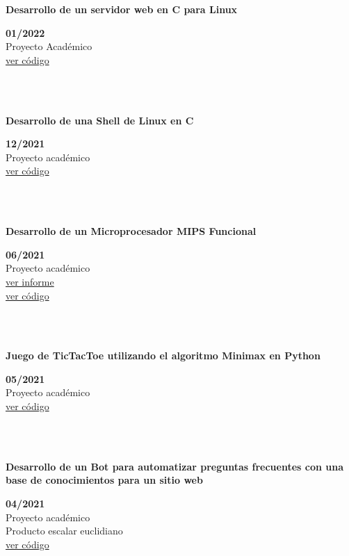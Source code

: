 \documentclass{article}
\begin{document}
\begin{minipage}{0.8\textwidth}
\parbox{0.8\linewidth}{\textbf{Desarrollo de un servidor web en C para Linux}} \hfill \textbf{01/2022}\\
Proyecto Académico\\
\href{https://github.com/geeksLabTech/web_server}{ver código}\\
\end{minipage} \hfill {}\\\\
\begin{minipage}{0.8\textwidth}
    \parbox{0.8\linewidth}{\textbf{Desarrollo de una Shell de Linux en C}} \hfill \textbf{12/2021}\\
    Proyecto académico\\
    \href{https://github.com/geeksLabTech/SO_Shell}{ver código}\\
    \end{minipage} \hfill {}\\\\
    \begin{minipage}{0.8\textwidth}
    \parbox{0.8\linewidth}{\textbf{Desarrollo de un Microprocesador MIPS Funcional}} \hfill \textbf{06/2021}\\
    Proyecto académico\\
    \href{https://github.com/JavierOramas/MIPS-Micro/blob/master/informe.pdf}{ver informe}\\
    \href{https://github.com/JavierOramas/MIPS-Micro}{ver código}\\
    \end{minipage} \hfill {}\\\\
    \begin{minipage}{0.8\textwidth}
    \parbox{0.8\linewidth}{\textbf{Juego de TicTacToe utilizando el algoritmo Minimax en Python}} \hfill \textbf{05/2021}\\
    Proyecto académico\\
    \href{https://github.com/JavierOramas/TicTacToe_AI}{ver código}\\
    \end{minipage} \hfill {}\\\\
    \begin{minipage}{0.8\textwidth}
    \parbox{0.8\linewidth}{\textbf{Desarrollo de un Bot para automatizar preguntas frecuentes con una base de conocimientos para un sitio web}} \hfill \textbf{04/2021}\\
    Proyecto académico\\
    Producto escalar euclidiano\\
    \href{https://github.com/JavierOramas/FAQ-Chat-Bot-Nous}{ver código}\\
    \end{minipage} \hfill {}\\\\
\end{document}
